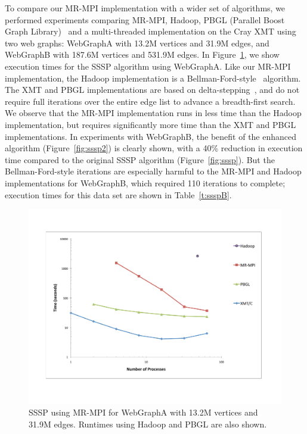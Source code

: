 To compare our MR-MPI implementation with a wider set of algorithms,
we performed experiments comparing MR-MPI, Hadoop, PBGL (Parallel
Boost Graph Library)~\cite{PBGL} and a multi-threaded implementation
on the Cray XMT using two web graphs: {WebGraphA} with 13.2M vertices
and 31.9M edges, and {WebGraphB} with 187.6M vertices and 531.9M
edges.  In Figure~\ref{f:ssspA}, we show execution times for the SSSP
algorithm using {WebGraphA}.  Like our MR-MPI implementation, the
Hadoop implementation is a Bellman-Ford-style~\cite{Bellman58,Ford62}
algorithm.  The XMT and PBGL implementations are based on
delta-stepping~\cite{MeyerSanders98}, and do not require full
iterations over the entire edge list to advance a breadth-first
search.  We observe that the MR-MPI implementation runs in less time
than the Hadoop implementation, but requires significantly more time
than the XMT and PBGL implementations.  In experiments with
{WebGraphB}, the benefit of the enhanced algorithm
(Figure~\ref{fig:sssp2}) is clearly shown, with a 40\% reduction in
execution time compared to the original SSSP algorithm
(Figure~\ref{fig:sssp}).  But the Bellman-Ford-style iterations are
especially harmful to the MR-MPI and Hadoop implementations for
{WebGraphB}, which required 110 iterations to complete; execution
times for this data set are shown in Table~\ref{t:ssspB}.

\begin{figure}[htb]
\includegraphics[width=\textwidth]{fig_ssspA.pdf}
\caption{SSSP using MR-MPI for WebGraphA with
13.2M vertices and 31.9M edges.  Runtimes using Hadoop and PBGL
are also shown.}
\label{f:ssspA}
\end{figure}

